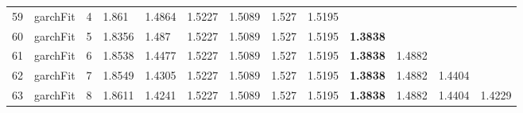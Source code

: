 \documentclass[10pt,a4paper]{article}
\begin{document}
\begin{table}[ht]
\begin{tabular}{rlrllllllllll}
  59 & garchFit &     4 & 1.861 & 1.4864 & 1.5227 & 1.5089 & 1.527 & 1.5195 &  &  &  &  \\ 
  60 & garchFit &     5 & 1.8356 & 1.487 & 1.5227 & 1.5089 & 1.527 & 1.5195 & \textbf{1.3838} &  &  &  \\ 
  61 & garchFit &     6 & 1.8538 & 1.4477 & 1.5227 & 1.5089 & 1.527 & 1.5195 & \textbf{1.3838} & 1.4882 &  &  \\ 
  62 & garchFit &     7 & 1.8549 & 1.4305 & 1.5227 & 1.5089 & 1.527 & 1.5195 & \textbf{1.3838} & 1.4882 & 1.4404 &  \\ 
  63 & garchFit &     8 & 1.8611 & 1.4241 & 1.5227 & 1.5089 & 1.527 & 1.5195 & \textbf{1.3838} & 1.4882 & 1.4404 & 1.4229 \\ 
   \hline
\end{tabular}
\end{table}
\end{document}
